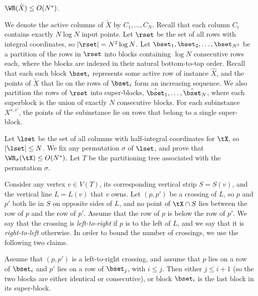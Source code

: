 \begin{lemma}\label{lem: bounding vertical WB for compressed}
	 $\WB(\tilde X)\leq O(N^*)$.
\end{lemma}

We denote the active columns of $\tilde X$ by $C_1,\ldots,C_N$. 
Recall that each column $C_i$ contains exactly $N\log N$ input points. 
Let $\rset$ be the set of all rows with integral coordinates, so $|\rset|=N^2\log N$. Let $\bset_1,\bset_2,\ldots,\bset_{N^2}$ be a partition of the rows in $\rset$ into blocks containing $\log N$ consecutive rows each, where the blocks are indexed in their natural bottom-to-top order. Recall that each such block $\bset_i$ represents some active row of instance $\hat X$, and the points of $\tilde X$ that lie on the rows of $\bset_i$ form an increasing sequence. We also partition the rows of $\rset$ into super-blocks, $\hat \bset_1,\ldots,\hat \bset_N$, where each superblock is the union of exactly $N$ consecutive blocks. For each subinstance $X^{s,s'}$, the points of the subinstance lie on rows that belong to a single super-block.


Let $\lset$ be the set of all columns with half-integral coordinates for $\tX$, so $|\lset|\leq N$. We fix any permutation $\sigma$ of $\lset$, and prove that $\WB_{\sigma}(\tX)\leq O(N^*)$. Let $T$ be the partitioning tree associated with the permutation $\sigma$.

Consider any vertex $v\in V(T)$, its corresponding vertical strip $S=S(v)$, and the vertical line $L= L(v)$ that $v$ owns. 
Let $(p,p')$ be a crossing of $L$, so $p$ and $p'$ both lie in $S$ on opposite sides of $L$, and no point of $\tX\cap S$ lies between the row of $p$ and the row of $p'$. Assume that the row of $p$ is below the row of $p'$. We say that the crossing is \emph{left-to-right} if $p$ is to the left of $L$, and we say that it is \emph{right-to-left} otherwise. In order to bound the number of crossings, we use the following two claims.

\begin{claim}\label{claim: left to right crossing}
	Assume that $(p,p')$ is a left-to-right crossing, and assume that $p$ lies on a row of $\bset_i$ and $p'$ lies on a row of $\bset_j$, with $i\leq j$. Then either $j\leq i+1$ (so the two blocks are either identical or consecutive), or block $\bset_i$ is the last block in its super-block.
\end{claim}


